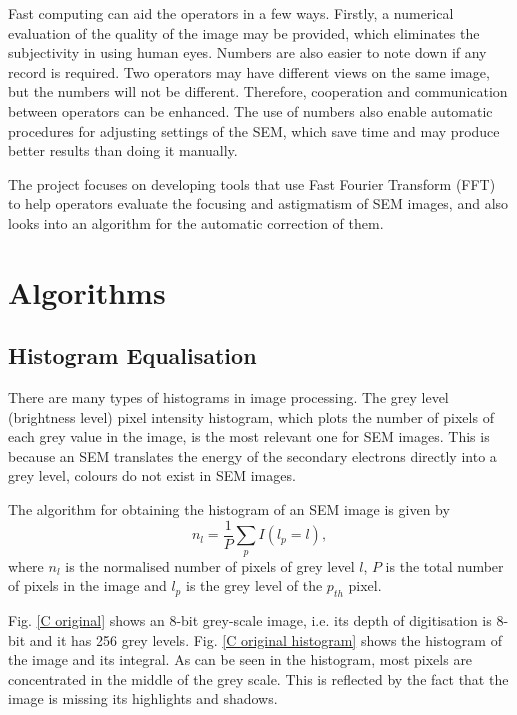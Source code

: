 \documentclass[conference]{IEEEtran}
\begin{document}
Fast computing can aid the operators in a few ways. Firstly, a numerical evaluation of the quality of the image may be provided, which eliminates the subjectivity in using human eyes. Numbers are also easier to note down if any record is required. Two operators may have different views on the same image, but the numbers will not be different. Therefore, cooperation and communication between operators can be enhanced. The use of numbers also enable automatic procedures for adjusting settings of the SEM, which save time and may produce better results than doing it manually.

The project focuses on developing tools that use Fast Fourier Transform (FFT) to help operators evaluate the focusing and astigmatism of SEM images, and also looks into an algorithm for the automatic correction of them.

\section{Algorithms}
\subsection{Histogram Equalisation} \label{Histogram Equalisation}
There are many types of histograms in image processing. The grey level (brightness level) pixel intensity histogram, which plots the number of pixels of each grey value in the image, is the most relevant one for SEM images. This is because an SEM translates the energy of the secondary electrons directly into a grey level, colours do not exist in SEM images.

The algorithm for obtaining the histogram of an SEM image is given by
\begin{equation}
    n_l = \frac{1}{P} \sum_{p} I(l_p=l),
\end{equation}
where $n_l$ is the normalised number of pixels of grey level $l$, $P$ is the total number of pixels in the image and $l_p$ is the grey level of the $p_{th}$ pixel. 

Fig. \ref{C original} shows an 8-bit grey-scale image, i.e. its depth of digitisation is 8-bit and it has 256 grey levels. Fig. \ref{C original histogram} shows the histogram of the image and its integral. As can be seen in the histogram, most pixels are concentrated in the middle of the grey scale. This is reflected by the fact that the image is missing its highlights and shadows.
\end{document}
